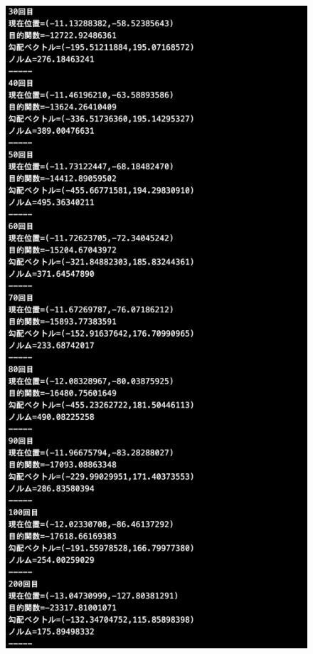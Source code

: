 \documentclass[12pt]{jarticle}
\begin{document}
\begin{figure}[h]
    \begin{minipage}{0.5\hsize}
        \begin{center}
            \includegraphics[scale=0.2]{kadai1_2s_out2_1_2.png}
        \end{center}

\end{minipage}
\end{figure}
\end{document}
